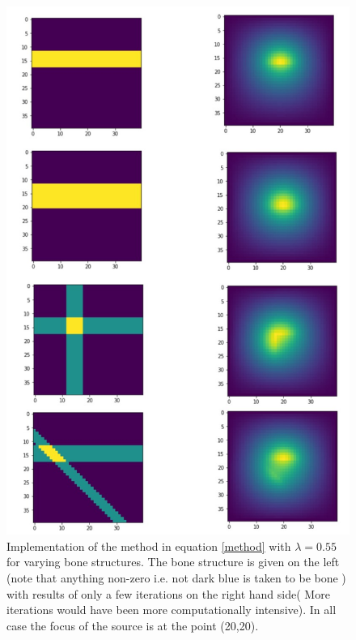 \documentclass[11pt]{article} %
\begin{document}
\begin{figure}
	\centering
	\includegraphics[height=0.8\textheight]{"Report_images/various bone structures"}
	\caption{Implementation of the method in equation  \ref{method} with $ \lambda=0.55 $ for varying bone structures. The bone structure is given on the left (note that anything non-zero i.e. not dark blue is taken to be bone ) with results of only a few iterations on the right hand side( More iterations would have been more computationally intensive). In all case the focus of the source is at the point (20,20). }
	\label{fig:various-bone-structures}
\end{figure}
\end{document}
